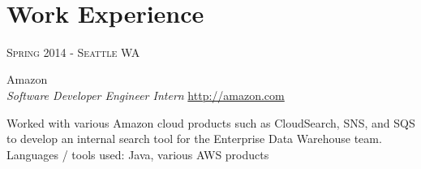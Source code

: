 \documentclass[10pt]{article} %
\begin{document}
\color{text1} %


\par{\\ %
	

\begin{minipage}[t]{0.5\textwidth} %
\vspace{0pt} %
	

\section{Work Experience} 


{\raggedleft\textsc{Spring 2014 - Seattle WA}\par}

{\raggedright\large Amazon \\
\textit{Software Developer Engineer Intern}  \hfill {\small \href{http://amazon.com}{http://amazon.com}}\\ [5pt]}

\normalsize{Worked with various Amazon cloud products such as CloudSearch, SNS, and SQS to develop an internal search tool for the Enterprise Data Warehouse team. Languages / tools used: Java, various AWS products}\\



\end{minipage}}
\end{document}
